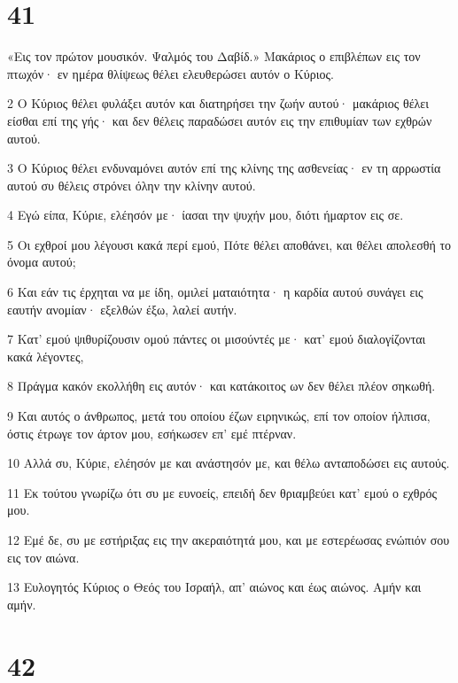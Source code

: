 \chapter{41}

\par «Εις τον πρώτον μουσικόν. Ψαλμός του Δαβίδ.» Μακάριος ο επιβλέπων εις τον πτωχόν· εν ημέρα θλίψεως θέλει ελευθερώσει αυτόν ο Κύριος.
\par 2 Ο Κύριος θέλει φυλάξει αυτόν και διατηρήσει την ζωήν αυτού· μακάριος θέλει είσθαι επί της γής· και δεν θέλεις παραδώσει αυτόν εις την επιθυμίαν των εχθρών αυτού.
\par 3 Ο Κύριος θέλει ενδυναμόνει αυτόν επί της κλίνης της ασθενείας· εν τη αρρωστία αυτού συ θέλεις στρόνει όλην την κλίνην αυτού.
\par 4 Εγώ είπα, Κύριε, ελέησόν με· ίασαι την ψυχήν μου, διότι ήμαρτον εις σε.
\par 5 Οι εχθροί μου λέγουσι κακά περί εμού, Πότε θέλει αποθάνει, και θέλει απολεσθή το όνομα αυτού;
\par 6 Και εάν τις έρχηται να με ίδη, ομιλεί ματαιότητα· η καρδία αυτού συνάγει εις εαυτήν ανομίαν· εξελθών έξω, λαλεί αυτήν.
\par 7 Κατ' εμού ψιθυρίζουσιν ομού πάντες οι μισούντές με· κατ' εμού διαλογίζονται κακά λέγοντες,
\par 8 Πράγμα κακόν εκολλήθη εις αυτόν· και κατάκοιτος ων δεν θέλει πλέον σηκωθή.
\par 9 Και αυτός ο άνθρωπος, μετά του οποίου έζων ειρηνικώς, επί τον οποίον ήλπισα, όστις έτρωγε τον άρτον μου, εσήκωσεν επ' εμέ πτέρναν.
\par 10 Αλλά συ, Κύριε, ελέησόν με και ανάστησόν με, και θέλω ανταποδώσει εις αυτούς.
\par 11 Εκ τούτου γνωρίζω ότι συ με ευνοείς, επειδή δεν θριαμβεύει κατ' εμού ο εχθρός μου.
\par 12 Εμέ δε, συ με εστήριξας εις την ακεραιότητά μου, και με εστερέωσας ενώπιόν σου εις τον αιώνα.
\par 13 Ευλογητός Κύριος ο Θεός του Ισραήλ, απ' αιώνος και έως αιώνος. Αμήν και αμήν.

\chapter{42}

